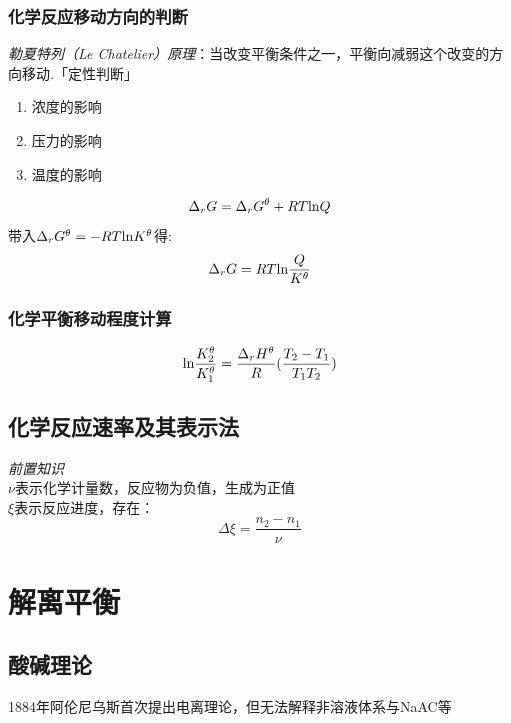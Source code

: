\documentclass[utf8,a4paper,12pt]{ctexart}
\begin{document}
\subsubsection{化学反应移动方向的判断}
\emph{勒夏特列（Le Chatelier）原理}：当改变平衡条件之一，平衡向减弱这个改变的方向移动.「定性判断」
\begin{enumerate}
\item 浓度的影响
\item 压力的影响
\item 温度的影响
\end{enumerate}
\[
\Delta_{r}G = \Delta_{r}G^{\theta} + RT{\rm ln}Q
\]
带入$\Delta_{r}G^{\theta} = -RT{\rm ln}K^{\theta}$得:
\begin{equation}
\Delta_{r}G = RT{\rm ln}\frac{Q}{K^{\theta}}
\end{equation}
\subsubsection{化学平衡移动程度计算}
\begin{equation}
{\rm ln}\frac{K_{2}^{\theta}}{K_{1}^{\theta}} = \frac{\Delta_{r}H^{\theta}}{R}(\frac{T_{2} - T_{1}}{T_{1}T_{2}})  
\end{equation}
\subsection{化学反应速率及其表示法}
\emph{前置知识}\\
$\nu$表示化学计量数，反应物为负值，生成为正值\\
$\xi$表示反应进度，存在：
\begin{equation}
\Delta\xi = \frac{n_{2} - n_{1}}{\nu}
\end{equation}
\newpage
\section{解离平衡}
\subsection{酸碱理论}
1884年阿伦尼乌斯首次提出电离理论，但无法解释非溶液体系与NaAC等
\end{document}
